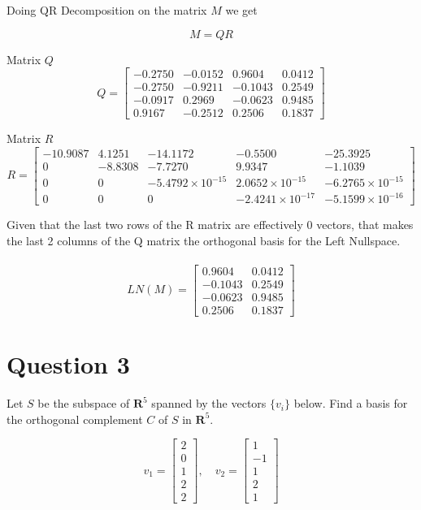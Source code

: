 \documentclass{article}
\begin{document}
Doing QR Decomposition on the matrix $M$ we get 

\[
M = Q R
\]

Matrix \( Q \)
\[
Q = \begin{bmatrix}
    -0.2750 & -0.0152 & 0.9604 & 0.0412 \\
    -0.2750 & -0.9211 & -0.1043 & 0.2549 \\
    -0.0917 & 0.2969 & -0.0623 & 0.9485 \\
    0.9167 & -0.2512 & 0.2506 & 0.1837
\end{bmatrix}
\]

Matrix \( R \)
\[
R = \begin{bmatrix}
    -10.9087 & 4.1251 & -14.1172 & -0.5500 & -25.3925 \\
    0 & -8.8308 & -7.7270 & 9.9347 & -1.1039 \\
    0 & 0 & -5.4792 \times 10^{-15} & 2.0652 \times 10^{-15} & -6.2765 \times 10^{-15} \\
    0 & 0 & 0 & -2.4241 \times 10^{-17} & -5.1599 \times 10^{-16}
\end{bmatrix}
\]

Given that the last two rows of the R matrix are effectively 0 vectors, that makes the last 2 columns of the Q matrix the orthogonal basis for the Left Nullspace.
\\
\\
\[LN(M) = \begin{bmatrix}
    0.9604 & 0.0412 \\
    -0.1043 & 0.2549 \\
    -0.0623 & 0.9485 \\
    0.2506 & 0.1837
\end{bmatrix}
\]

\section{Question 3}

Let \( S \) be the subspace of \( \mathbf{R}^5 \) spanned by the vectors \( \{v_i\} \) below. Find a basis for the orthogonal complement \( C \) of \( S \) in \( \mathbf{R}^5 \).

\[
v_1 = \begin{bmatrix} 2 \\ 0 \\ 1 \\ 2 \\ 2 \end{bmatrix}, \quad v_2 = \begin{bmatrix} 1 \\ -1 \\ 1 \\ 2 \\ 1 \end{bmatrix}
\]
\end{document}
